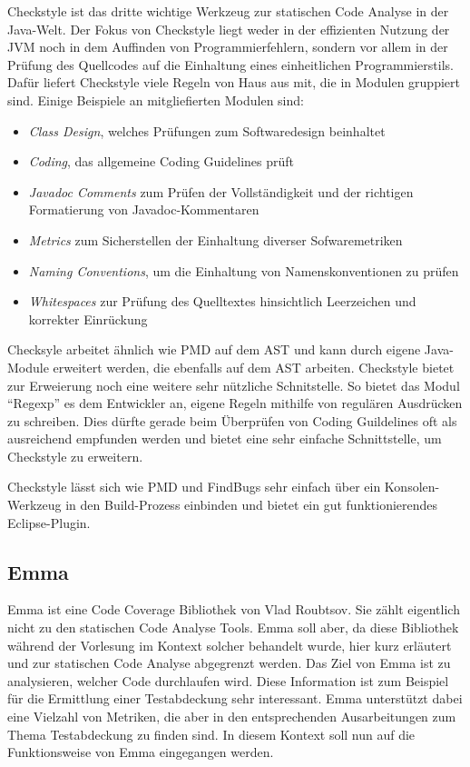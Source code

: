 Checkstyle ist das dritte wichtige Werkzeug zur statischen Code Analyse in der Java-Welt. Der Fokus von Checkstyle liegt weder in der effizienten Nutzung der JVM noch in dem Auffinden von Programmierfehlern, sondern vor allem in der Prüfung des Quellcodes auf die Einhaltung eines einheitlichen Programmierstils. 
Dafür liefert Checkstyle viele Regeln von Haus aus mit, die in Modulen gruppiert sind. Einige Beispiele an mitgliefierten Modulen sind:
\begin{itemize}
\item \textit{Class Design}, welches Prüfungen zum Softwaredesign beinhaltet
\item \textit{Coding}, das allgemeine Coding Guidelines prüft
\item \textit{Javadoc Comments} zum Prüfen der Vollständigkeit und der richtigen Formatierung von Javadoc-Kommentaren
\item \textit{Metrics} zum Sicherstellen der  Einhaltung diverser Sofwaremetriken
\item \textit{Naming Conventions}, um die Einhaltung von Namenskonventionen zu prüfen
\item \textit{Whitespaces} zur Prüfung des Quelltextes hinsichtlich Leerzeichen und korrekter Einrückung
\end{itemize}
Checksyle arbeitet ähnlich wie PMD auf dem AST und kann durch eigene Java-Module erweitert werden, die ebenfalls auf dem AST arbeiten. Checkstyle bietet zur Erweierung noch eine weitere sehr nützliche Schnitstelle. So bietet das Modul ``Regexp'' es dem Entwickler an, eigene Regeln mithilfe von regulären Ausdrücken zu schreiben. Dies dürfte gerade beim Überprüfen von Coding Guildelines oft als ausreichend empfunden werden und bietet eine sehr einfache Schnittstelle, um Checkstyle zu erweitern.

Checkstyle lässt sich wie PMD und FindBugs sehr einfach über ein Konsolen-Werkzeug in den Build-Prozess einbinden und bietet ein gut funktionierendes Eclipse-Plugin.


\subsection{Emma}

Emma ist eine Code Coverage Bibliothek von Vlad Roubtsov. Sie zählt eigentlich nicht zu den statischen Code Analyse Tools. Emma soll aber, da diese Bibliothek während der Vorlesung im Kontext solcher behandelt wurde, hier kurz erläutert und zur statischen Code Analyse abgegrenzt werden. 
Das Ziel von Emma ist zu analysieren, welcher Code durchlaufen wird. Diese Information ist zum Beispiel für die Ermittlung einer Testabdeckung sehr interessant. Emma unterstützt dabei eine Vielzahl von Metriken, die aber in den entsprechenden Ausarbeitungen zum Thema Testabdeckung zu finden sind. In diesem Kontext soll nun auf die Funktionsweise von Emma eingegangen werden.

